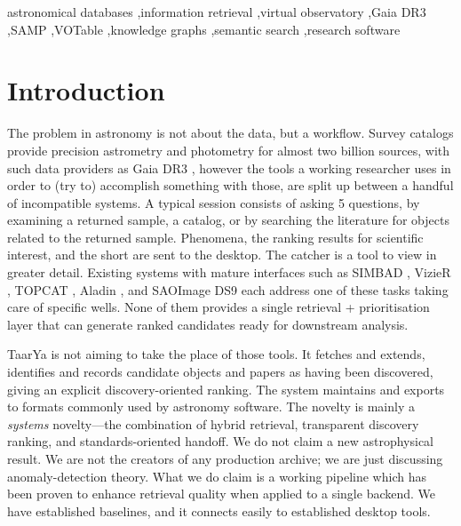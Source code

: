 \documentclass[preprint,12pt,authoryear]{elsarticle}
\begin{document}
\begin{frontmatter}
\begin{keyword}
astronomical databases \sep information retrieval \sep virtual observatory \sep Gaia DR3 \sep SAMP \sep VOTable \sep knowledge graphs \sep semantic search \sep research software
\end{keyword}
\end{frontmatter}
\linenumbers

\section{Introduction}
\label{sec:intro}
The problem in astronomy is not about the data, but a workflow. Survey catalogs provide precision astrometry and photometry for almost two billion sources, with such data providers as Gaia DR3 \citep{Vallenari2023, Lindegren2021}, however the tools a working researcher uses in order to (try to) accomplish something with those, are split up between a handful of incompatible systems. A typical session consists of asking 5 questions, by examining a returned sample, a catalog, or by searching the literature for objects related to the returned sample. Phenomena, the ranking results for scientific interest, and the short are sent to the desktop. The catcher is a tool to view in greater detail. Existing systems with mature interfaces such as SIMBAD \citep{Wenger2000}, VizieR \citep{Ochsenbein2000}, TOPCAT \citep{Taylor2005}, Aladin \citep{Bonnarel2000}, and SAOImage DS9 \citep{Joye2003} each address one of these tasks taking care of specific wells. None of them provides a single retrieval + prioritisation layer that can generate ranked candidates ready for downstream analysis.

\textsf{TaarYa} is not aiming to take the place of those tools. It fetches and extends, identifies and records candidate objects and papers as having been discovered, giving an explicit discovery-oriented ranking. The system maintains and exports to formats commonly used by astronomy software. The novelty is mainly a \emph{systems} novelty---the combination of hybrid retrieval, transparent discovery ranking, and standards-oriented handoff. We do not claim a new astrophysical result. We are not the creators of any production archive; we are just discussing anomaly-detection theory. What we do claim is a working pipeline which has been proven to enhance retrieval quality when applied to a single backend. We have established baselines, and it connects easily to established desktop tools.
\end{document}
